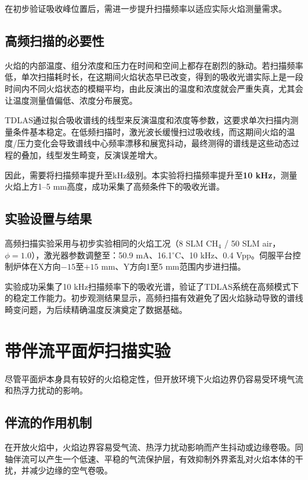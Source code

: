 在初步验证吸收峰位置后，需进一步提升扫描频率以适应实际火焰测量需求。

\subsection{高频扫描的必要性}

火焰的内部温度、组分浓度和压力在时间和空间上都存在剧烈的脉动。若扫描频率低，单次扫描耗时长，在这期间火焰状态早已改变，得到的吸收光谱实际上是一段时间内不同火焰状态的模糊平均，由此反演出的温度和浓度就会严重失真，尤其会让温度测量值偏低、浓度分布展宽。

TDLAS通过拟合吸收谱线的线型来反演温度和浓度等参数，这要求单次扫描内测量条件基本稳定。在低频扫描时，激光波长缓慢扫过吸收线，而这期间火焰的温度/压力变化会导致谱线中心频率漂移和展宽抖动，最终测得的谱线是这些动态过程的叠加，线型发生畸变，反演误差增大。

因此，需要将扫描频率提升至kHz级别。本实验将扫描频率提升至\textbf{10 kHz}，测量火焰上方1--5 mm高度，成功采集了高频条件下的吸收光谱。

\subsection{实验设置与结果}

高频扫描实验采用与初步实验相同的火焰工况（8 SLM CH$_4$ / 50 SLM air，$\phi=1.0$），激光器参数调整至：50.9 mA、16.1$^\circ$C、10 kHz、0.4 Vpp。伺服平台控制炉体在X方向$-15$至$+15$ mm、Y方向1至5 mm范围内步进扫描。

实验成功采集了10 kHz扫描频率下的吸收光谱，验证了TDLAS系统在高频模式下的稳定工作能力。初步观测结果显示，高频扫描有效避免了因火焰脉动导致的谱线畸变问题，为后续精确温度反演奠定了数据基础。


\section{带伴流平面炉扫描实验}

尽管平面炉本身具有较好的火焰稳定性，但开放环境下火焰边界仍容易受环境气流和热浮力扰动的影响。

\subsection{伴流的作用机制}

在开放火焰中，火焰边界容易受气流、热浮力扰动影响而产生抖动或边缘卷吸。同轴伴流可以产生一个低速、平稳的气流保护层，有效抑制外界紊乱对火焰本体的干扰，并减少边缘的空气卷吸。


